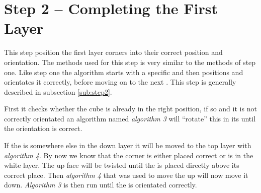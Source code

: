 \section{Step 2 -- Completing the First Layer}
This step position the first layer corners into their correct position and orientation. The methods used for this step is very similar to the methods of step one. 
Like step one the algorithm starts with a specific \cpiece{} and then positions and orientates it correctly, before moving on to the next \cpiece. 
This step is generally described in subsection \ref{sub:step2}.

First it checks whether the cube is already in the right position, if so and it is not correctly orientated an algorithm named \textit{algorithm 3} will ``rotate'' this \cpiece{} in its \cubicle{} until the orientation is correct. 

If the \cpiece{} is somewhere else in the down layer it will be moved to the top layer with \textit{algorithm 4}. 
By now we know that the corner \cpiece{} is either placed correct or is in the white layer. 
The up face will be twisted until the \cpiece{} is placed directly above its correct place. 
Then \textit{algorithm 4} that was used to move the \cpiece{} up will now move it down. 
\textit{Algorithm 3} is then run until the \cpiece{} is orientated correctly.
